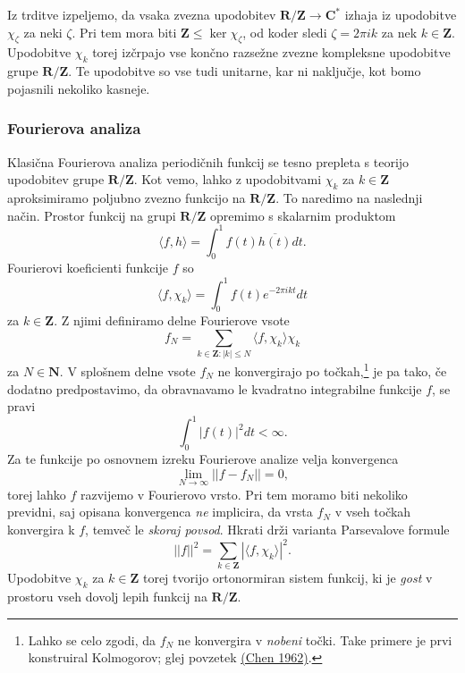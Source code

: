 \documentclass[11pt]{book}
\def\NN{\mathbf{N}}
\def\ZZ{\mathbf{Z}}
\def\RR{\mathbf{R}}
\def\CC{\mathbf{C}}
\theoremstyle{definition}
\theoremstyle{zgled}
\theoremstyle{zgledbrezstevilke}
\theoremstyle{odprtproblem}
\theoremstyle{domacanaloga}
\theoremstyle{izrek}
\begin{document}
Iz trditve izpeljemo, da vsaka zvezna upodobitev $\RR/\ZZ \to \CC^*$ izhaja iz upodobitve $\chi_{\zeta}$ za neki $\zeta$. Pri tem mora biti $\ZZ \leq \ker \chi_{\zeta}$, od koder sledi $\zeta = 2 \pi i k$ za nek $k \in \ZZ$. Upodobitve $\chi_k$ torej izčrpajo vse končno razsežne zvezne kompleksne upodobitve grupe $\RR/\ZZ$. Te upodobitve so vse tudi unitarne, kar ni naključje, kot bomo pojasnili nekoliko kasneje.

\subsubsection{Fourierova analiza}

Klasična Fourierova analiza periodičnih funkcij se tesno prepleta s teorijo upodobitev grupe $\RR/\ZZ$. Kot vemo, lahko z upodobitvami $\chi_k$ za $k \in \ZZ$ aproksimiramo poljubno zvezno funkcijo na $\RR/\ZZ$. To naredimo na naslednji način. Prostor funkcij na grupi $\RR/\ZZ$ opremimo s skalarnim produktom
\[
    \langle f, h \rangle = \int_{0}^{1} f(t) \overline{h(t)} dt.
\]
Fourierovi koeficienti funkcije $f$ so
\[
    \langle f, \chi_k \rangle = \int_0^1 f(t) e^{-2 \pi i k t} dt
\]
za $k \in \ZZ$. Z njimi definiramo delne Fourierove vsote
\[
    f_N = \sum_{k \in \ZZ \colon |k| \leq N} \langle f, \chi_k \rangle \chi_k
\]
za $N \in \NN$. V splošnem delne vsote $f_N$ ne konvergirajo po točkah,\footnote{Lahko se celo zgodi, da $f_N$ ne konvergira v \emph{nobeni} točki. Take primere je prvi konstruiral Kolmogorov; glej povzetek \href{https://projecteuclid.org/journals/proceedings-of-the-japan-academy-series-a-mathematical-sciences/volume-38/issue-6/A-remarkable-divergent-Fourier-series/10.3792/pja/1195523374.full?tab=ArticleLink}{(Chen 1962)}.} je pa tako, če dodatno predpostavimo, da obravnavamo le kvadratno integrabilne funkcije $f$, se pravi
\[
    \int_0^1 |f(t)|^2 dt < \infty. 
\]
Za te funkcije po osnovnem izreku Fourierove analize velja konvergenca
\[
    \lim_{N \to \infty} || f - f_N || = 0,
\]
torej lahko $f$ razvijemo v Fourierovo vrsto. Pri tem moramo biti nekoliko previdni, saj opisana konvergenca \emph{ne} implicira, da vrsta $f_N$ v vseh točkah konvergira k $f$, temveč le \emph{skoraj povsod}. Hkrati drži varianta Parsevalove formule
\[
  ||f||^2 = \sum_{k \in \ZZ} |\langle f, \chi_k \rangle|^2.
\]
Upodobitve $\chi_k$ za $k \in \ZZ$ torej tvorijo ortonormiran sistem funkcij, ki je \emph{gost} v prostoru vseh dovolj lepih funkcij na $\RR/\ZZ$. 
\end{document}
